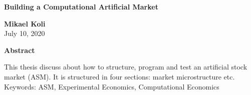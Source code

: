 \thispagestyle{plain}
\begin{center}
    \Large
    \textbf{Building a Computational Artificial Market}
        
    \vspace{0.4cm}
    \large
        
    \vspace{0.4cm}
    \textbf{Mikael Koli} \\
    July 10, 2020
       
    \vspace{0.9cm}
    \textbf{Abstract}
\end{center}

This thesis discuss about how to structure, program
and test an artificial stock market (ASM). It is structured
in four sections: market microstructure etc. \\

Keywords: ASM, Experimental Economics, Computational Economics\\